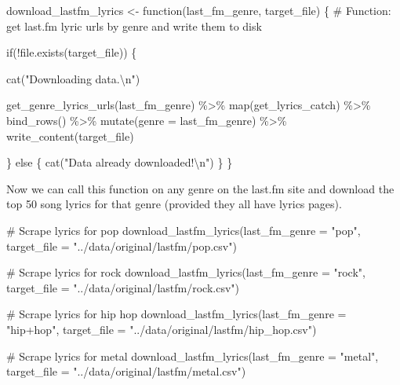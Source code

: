 \documentclass[
  letterpaper,
]{latex/krantz}
\newenvironment{Shaded}{\begin{snugshade}}{\end{snugshade}}
\newcommand{\AttributeTok}[1]{\textcolor[rgb]{0.40,0.45,0.13}{#1}}
\newcommand{\CommentTok}[1]{\textcolor[rgb]{0.37,0.37,0.37}{#1}}
\newcommand{\ControlFlowTok}[1]{\textcolor[rgb]{0.00,0.23,0.31}{#1}}
\newcommand{\FunctionTok}[1]{\textcolor[rgb]{0.28,0.35,0.67}{#1}}
\newcommand{\NormalTok}[1]{\textcolor[rgb]{0.00,0.23,0.31}{#1}}
\newcommand{\OtherTok}[1]{\textcolor[rgb]{0.00,0.23,0.31}{#1}}
\newcommand{\SpecialCharTok}[1]{\textcolor[rgb]{0.37,0.37,0.37}{#1}}
\newcommand{\StringTok}[1]{\textcolor[rgb]{0.13,0.47,0.30}{#1}}
\begin{document}
\begin{Shaded}
\begin{Highlighting}[]
\NormalTok{download\_lastfm\_lyrics }\OtherTok{\textless{}{-}} \ControlFlowTok{function}\NormalTok{(last\_fm\_genre, target\_file) \{}
  \CommentTok{\# Function: get last.fm lyric urls by genre and write them to disk}
  
  \ControlFlowTok{if}\NormalTok{(}\SpecialCharTok{!}\FunctionTok{file.exists}\NormalTok{(target\_file)) \{}
    
    \FunctionTok{cat}\NormalTok{(}\StringTok{"Downloading data.}\SpecialCharTok{\textbackslash{}n}\StringTok{"}\NormalTok{)}
    
    \FunctionTok{get\_genre\_lyrics\_urls}\NormalTok{(last\_fm\_genre) }\SpecialCharTok{\%\textgreater{}\%} 
      \FunctionTok{map}\NormalTok{(get\_lyrics\_catch) }\SpecialCharTok{\%\textgreater{}\%} 
      \FunctionTok{bind\_rows}\NormalTok{() }\SpecialCharTok{\%\textgreater{}\%} 
      \FunctionTok{mutate}\NormalTok{(}\AttributeTok{genre =}\NormalTok{ last\_fm\_genre) }\SpecialCharTok{\%\textgreater{}\%} 
      \FunctionTok{write\_content}\NormalTok{(target\_file)}
    
\NormalTok{  \} }\ControlFlowTok{else}\NormalTok{ \{}
    \FunctionTok{cat}\NormalTok{(}\StringTok{"Data already downloaded!}\SpecialCharTok{\textbackslash{}n}\StringTok{"}\NormalTok{)}
\NormalTok{  \}}
\NormalTok{\}}
\end{Highlighting}
\end{Shaded}

Now we can call this function on any genre on the last.fm site and
download the top 50 song lyrics for that genre (provided they all have
lyrics pages).

\begin{Shaded}
\begin{Highlighting}[]
\CommentTok{\# Scrape lyrics for \textquotesingle{}pop\textquotesingle{}}
\FunctionTok{download\_lastfm\_lyrics}\NormalTok{(}\AttributeTok{last\_fm\_genre =} \StringTok{"pop"}\NormalTok{, }\AttributeTok{target\_file =} \StringTok{"../data/original/lastfm/pop.csv"}\NormalTok{)}

\CommentTok{\# Scrape lyrics for \textquotesingle{}rock\textquotesingle{}}
\FunctionTok{download\_lastfm\_lyrics}\NormalTok{(}\AttributeTok{last\_fm\_genre =} \StringTok{"rock"}\NormalTok{, }\AttributeTok{target\_file =} \StringTok{"../data/original/lastfm/rock.csv"}\NormalTok{)}

\CommentTok{\# Scrape lyrics for \textquotesingle{}hip hop\textquotesingle{}}
\FunctionTok{download\_lastfm\_lyrics}\NormalTok{(}\AttributeTok{last\_fm\_genre =} \StringTok{"hip+hop"}\NormalTok{, }\AttributeTok{target\_file =} \StringTok{"../data/original/lastfm/hip\_hop.csv"}\NormalTok{)}

\CommentTok{\# Scrape lyrics for \textquotesingle{}metal\textquotesingle{}}
\FunctionTok{download\_lastfm\_lyrics}\NormalTok{(}\AttributeTok{last\_fm\_genre =} \StringTok{"metal"}\NormalTok{, }\AttributeTok{target\_file =} \StringTok{"../data/original/lastfm/metal.csv"}\NormalTok{)}
\end{Highlighting}
\end{Shaded}
\end{document}
